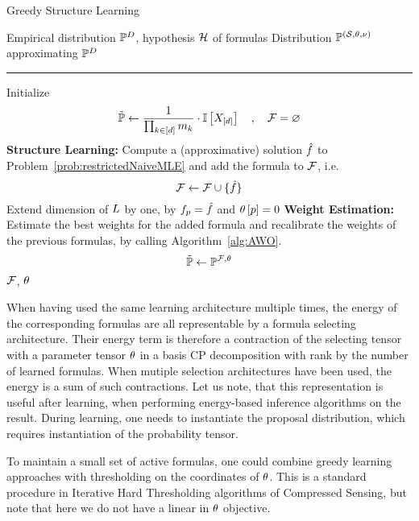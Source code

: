 \begin{algorithm}[hbt!]
\caption{Greedy Structure Learning}\label{alg:greedyStructureLearning}
\begin{algorithmic}
	\Require Empirical distribution $\mathbb{P}^{D}$, hypothesis $\mathcal{H}$ of formulas
	\Ensure Distribution $\mathbb{P}^{(\mathcal{S},\theta,\nu)}$ approximating $\mathbb{P}^{D}$
	\hrule
	\State Initialize
		\[ \tilde{\mathbb{P}} \leftarrow \frac{1}{\prod_{k\in[d]}m_{k}} \cdot \mathbb{I}\left[X_{[d]}\right] \quad, \quad \mathcal{F} = \varnothing \]
		\State \textbf{Structure Learning:} Compute a (approximative) solution $\hat{f}$ to Problem~\ref{prob:restrictedNaiveMLE} and add the formula to $\mathcal{F}$, i.e.
				\[ \mathcal{F} \leftarrow \mathcal{F} \cup\{\hat{f}\} \]
			Extend dimension of $L$ by one, by $f_{p}=\hat{f}$ and $\theta\left[p\right]=0$
		\State \textbf{Weight Estimation:} Estimate the best weights for the added formula and recalibrate the weights of the previous formulas, by calling Algorithm~\ref{alg:AWO}.
				\[ \tilde{\mathbb{P}} \leftarrow \mathbb{P}^{\mathcal{F}, \theta} \]
\EndWhile
	\State \Return $\mathcal{F}$, $\theta$ %
\end{algorithmic}
\end{algorithm}



When having used the same learning architecture multiple times, the energy of the corresponding formulas are all representable by a formula selecting architecture.
Their energy term is therefore a contraction of the selecting tensor with a parameter tensor $\theta$ in a basis CP decomposition with rank by the number of learned formulas.
When mutiple selection architectures have been used, the energy is a sum of such contractions.
% 
Let us note, that this representation is useful after learning, when performing energy-based inference algorithms on the result.
During learning, one needs to instantiate the proposal distribution, which requires instantiation of the probability tensor.


\begin{remark}
	To maintain a small set of active formulas, one could combine greedy learning approaches with thresholding on the coordinates of $\theta$.
	This is a standard procedure in Iterative Hard Thresholding algorithms of Compressed Sensing, but note that here we do not have a linear in $\theta$ objective.
\end{remark}




